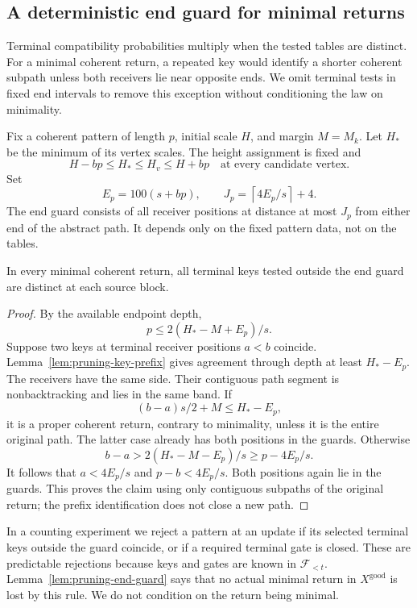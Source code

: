 \subsection{A deterministic end guard for minimal returns}

Terminal compatibility probabilities multiply when the tested tables
are distinct.  For a minimal coherent return, a repeated key would
identify a shorter coherent subpath unless both receivers lie near
opposite ends.  We omit terminal tests in fixed end intervals to remove
this exception without conditioning the law on minimality.

Fix a coherent pattern of length $p$, initial scale $H$, and margin
$M=M_k$.  Let $H_*$ be the minimum of its vertex scales.  The
height assignment is fixed and
\begin{equation}
\label{eq:pruning-scale-window}
 H-bp\leq H_*\leq H_v\leq H+bp
 \quad\text{at every candidate vertex}.
\end{equation}
Set
\[
 E_p=100(s+bp),\qquad
 J_p=\left\lceil4E_p/s\right\rceil+4.
\]
The end guard consists of all receiver positions at distance at
most $J_p$ from either end of the abstract path.  It depends only
on the fixed pattern data, not on the tables.

\begin{lemma}
\label{lem:pruning-end-guard}
In every minimal coherent return, all terminal keys tested outside
the end guard are distinct at each source block.
\end{lemma}

\begin{proof}
By the available endpoint depth,
\[
  p\leq2(H_*-M+E_p)/s.
\]
Suppose two keys at terminal receiver positions $a<b$ coincide.
Lemma~\ref{lem:pruning-key-prefix} gives agreement through depth
at least $H_*-E_p$.  The receivers have the same side.  Their
contiguous path segment is nonbacktracking and lies in the same
band.  If
\[
 (b-a)s/2+M\leq H_*-E_p,
\]
it is a proper coherent return, contrary to minimality, unless it
is the entire original path.  The latter case already has both
positions in the guards.  Otherwise
\[
 b-a>2(H_*-M-E_p)/s\geq p-4E_p/s.
\]
It follows that $a<4E_p/s$ and $p-b<4E_p/s$.  Both positions
again lie in the guards.  This proves the claim using only contiguous
subpaths of the original return; the prefix identification does not
close a new path.
\end{proof}

In a counting experiment we reject a pattern at an update if its
selected terminal keys outside the guard coincide, or if a
required terminal gate is closed.  These are predictable
rejections because keys and gates are known in
$\mathcal F_{<t}$.  Lemma~\ref{lem:pruning-end-guard} says that
no actual minimal return in $X^{\mathrm{good}}$ is lost by this
rule.  We do not condition on the return being minimal.

